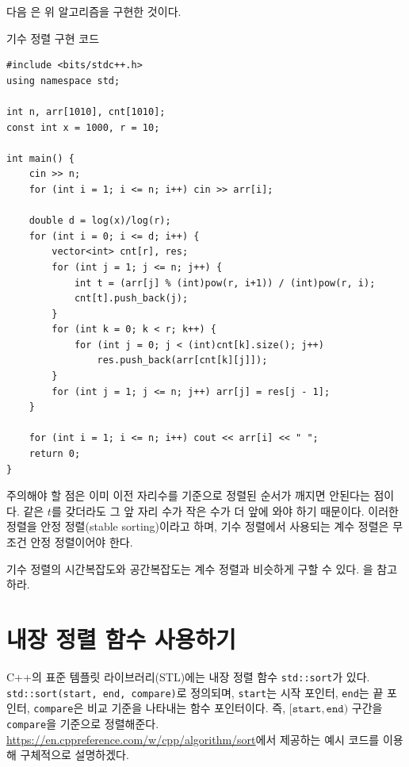 다음 은 위 알고리즘을 구현한 것이다.

\begin{code} \label{code: radixsort}
기수 정렬 구현 코드
\begin{lstlisting}
#include <bits/stdc++.h>
using namespace std;

int n, arr[1010], cnt[1010];
const int x = 1000, r = 10;

int main() {
    cin >> n;
    for (int i = 1; i <= n; i++) cin >> arr[i];

    double d = log(x)/log(r);
    for (int i = 0; i <= d; i++) {
        vector<int> cnt[r], res;
        for (int j = 1; j <= n; j++) {
            int t = (arr[j] % (int)pow(r, i+1)) / (int)pow(r, i);
            cnt[t].push_back(j);
        }
        for (int k = 0; k < r; k++) {
            for (int j = 0; j < (int)cnt[k].size(); j++) 
                res.push_back(arr[cnt[k][j]]);
        }
        for (int j = 1; j <= n; j++) arr[j] = res[j - 1];
    }

    for (int i = 1; i <= n; i++) cout << arr[i] << " ";
    return 0;
}

\end{lstlisting}
\end{code}

주의해야 할 점은 이미 이전 자리수를 기준으로 정렬된 순서가 깨지면 안된다는 점이다. 같은 $t$를 갖더라도 그 앞 자리 수가 작은 수가 더 앞에 와야 하기 때문이다. 이러한 정렬을 안정 정렬(stable sorting)이라고 하며, 기수 정렬에서 사용되는 계수 정렬은 무조건 안정 정렬이어야 한다.

기수 정렬의 시간복잡도와 공간복잡도는 계수 정렬과 비슷하게 구할 수 있다. 을 참고하라.

\section{내장 정렬 함수 사용하기}
C++의 표준 템플릿 라이브러리(STL)에는 내장 정렬 함수 \texttt{std::sort}가 있다. \texttt{std::sort(start, end, compare)}로 정의되며, \texttt{start}는 시작 포인터, \texttt{end}는 끝 포인터, \texttt{compare}은 비교 기준을 나타내는 함수 포인터이다. 즉, $[\texttt{start}, \texttt{end})$ 구간을 \texttt{compare}을 기준으로 정렬해준다. \url{https://en.cppreference.com/w/cpp/algorithm/sort}에서 제공하는 예시 코드를 이용해 구체적으로 설명하겠다.


